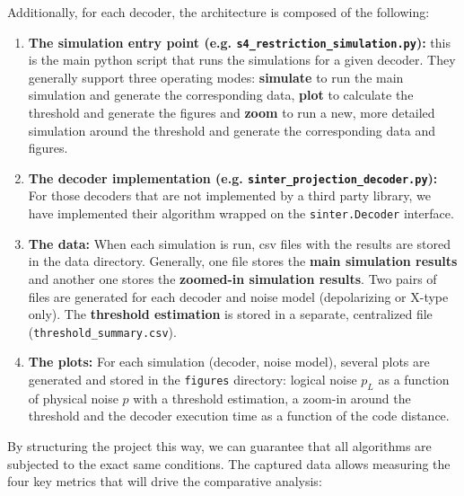 Additionally, for each decoder, the architecture is composed of the following:

\begin{enumerate}
    \item \textbf{The simulation entry point (e.g. \texttt{s4\_restriction\_simulation.py}):} this is the main python script that runs the simulations for a given decoder. They generally support three operating modes: \textbf{simulate} to run the main simulation and generate the corresponding data, \textbf{plot} to calculate the threshold and generate the figures and \textbf{zoom} to run a new, more detailed simulation around the threshold and generate the corresponding data and figures.

    \item \textbf{The decoder implementation (e.g. \texttt{sinter\_projection\_decoder.py}):} For those decoders that are not implemented by a third party library, we have implemented their algorithm wrapped on the \texttt{sinter.Decoder} interface. 

   \item \textbf{The data:} When each simulation is run, csv files with the results are stored in the data directory. Generally, one file stores the \textbf{main simulation results} and another one stores the \textbf{zoomed-in simulation results}. Two pairs of files are generated for each decoder and noise model (depolarizing or X-type only). The \textbf{threshold estimation} is stored in a separate, centralized file (\texttt{threshold\_summary.csv}). 

   \item \textbf{The plots:} For each simulation (decoder, noise model), several plots are generated and stored in the \texttt{figures} directory: logical noise $p_L$ as a function of physical noise $p$ with a threshold estimation, a zoom-in around the threshold and the decoder execution time as a function of the code distance.
    
\end{enumerate}

By structuring the project this way, we can guarantee that all algorithms are subjected to the exact same conditions. The captured data allows measuring the four key metrics that will drive the comparative analysis:

